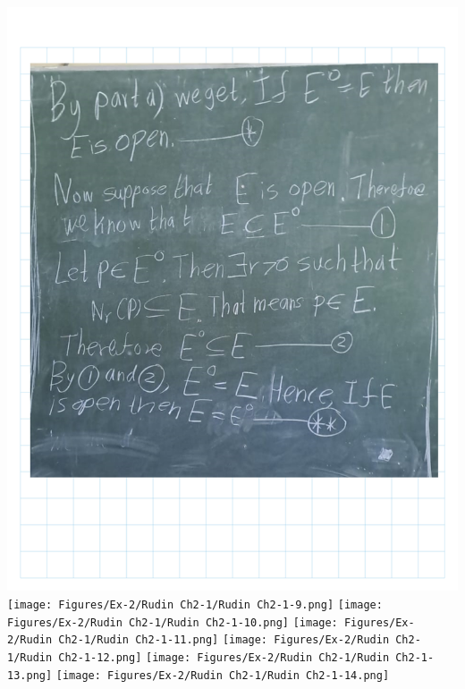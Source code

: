 \documentclass[
]{book}
\theoremstyle{definition}
\theoremstyle{definition}
\theoremstyle{definition}
\theoremstyle{definition}
\theoremstyle{remark}
\begin{document}
\includegraphics{Figures/Ex-2/Rudin Ch2-1/Rudin Ch2-1-8.png}
\texttt{[image: Figures/Ex-2/Rudin Ch2-1/Rudin Ch2-1-9.png]}
\texttt{[image: Figures/Ex-2/Rudin Ch2-1/Rudin Ch2-1-10.png]}
\texttt{[image: Figures/Ex-2/Rudin Ch2-1/Rudin Ch2-1-11.png]}
\texttt{[image: Figures/Ex-2/Rudin Ch2-1/Rudin Ch2-1-12.png]}
\texttt{[image: Figures/Ex-2/Rudin Ch2-1/Rudin Ch2-1-13.png]}
\texttt{[image: Figures/Ex-2/Rudin Ch2-1/Rudin Ch2-1-14.png]}
\end{document}
